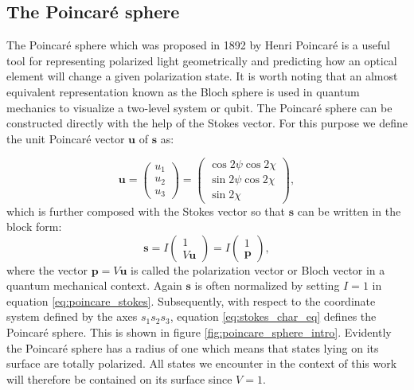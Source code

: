 \subsection{The Poincaré sphere}
\label{sec:the_poincare_sphere}
The Poincaré sphere which was proposed in 1892 by Henri Poincaré is a useful tool for representing polarized light geometrically and predicting how an optical element will change a given polarization state. It is worth noting that an almost equivalent representation known as the Bloch sphere is used in quantum mechanics to visualize a two-level system or qubit. The Poincaré sphere can be constructed directly with the help of the Stokes vector. For this purpose we define the unit Poincaré vector $\bm{u}$ of $\bm{s}$ as:

\begin{equation}
    \bm{u}=
    \begin{pmatrix}
    u_1 \\
    u_2 \\
    u_3
    \end{pmatrix}
    =
    \begin{pmatrix}
    \cos 2\psi \cos 2\chi \\
    \sin 2\psi \cos 2\chi \\
    \sin 2\chi
    \end{pmatrix},
\end{equation}
which is further composed with the Stokes vector so that $\bm{s}$ can be written in the block form: %
\begin{equation}
    \label{eq:poincare_stokes}
    \bm{s}=I
    \begin{pmatrix}
    1 \\
    V \bm{u}
    \end{pmatrix}
    =I
    \begin{pmatrix}
    1 \\
    \bm{p}
    \end{pmatrix},
\end{equation}
where the vector $\bm{p}=V\bm{u}$ is called the polarization vector or Bloch vector in a quantum mechanical context. Again $\bm{s}$ is often normalized by setting $I=1$ in equation \ref{eq:poincare_stokes}. Subsequently, with respect to the coordinate system defined by the axes $s_1s_2s_3$, equation \ref{eq:stokes_char_eq} defines the Poincaré sphere. This is shown in figure \ref{fig:poincare_sphere_intro}. Evidently the Poincaré sphere has a radius of one which means that states lying on its surface are totally polarized. All states we encounter in the context of this work will therefore be contained on its surface since $V=1$.

